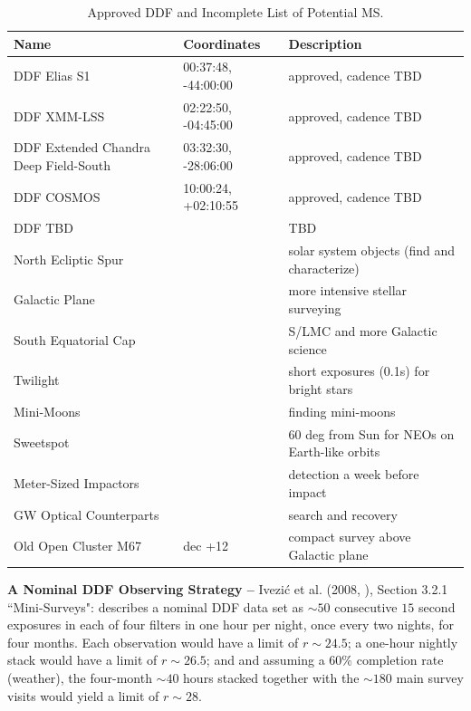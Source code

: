 \documentclass[DM,lsstdraft,toc]{lsstdoc}
\begin{document}
\begin{table}[h]
\begin{center}
\begin{footnotesize}
\caption{Approved DDF and Incomplete List of Potential MS.}
\label{tab:ddfms}
\begin{tabular}{lll}
\hline \hline
Name & Coordinates & Description  \\
\hline
DDF Elias S1    & 00:37:48, -44:00:00  & approved, cadence TBD \\
DDF XMM-LSS & 02:22:50, -04:45:00  & approved, cadence TBD  \\
DDF Extended Chandra Deep Field-South & 03:32:30, -28:06:00  & approved, cadence TBD  \\
DDF COSMOS  & 10:00:24, +02:10:55 & approved, cadence TBD  \\
DDF TBD  & & TBD \\
North Ecliptic Spur      & & solar system objects (find and characterize) \\
Galactic Plane             & & more intensive stellar surveying \\
South Equatorial Cap  & & S/LMC and more Galactic science \\
Twilight                        & & short exposures (0.1s) for bright stars \\
Mini-Moons                     &  & finding mini-moons \\
Sweetspot                       & & 60 deg from Sun for NEOs on Earth-like orbits \\
Meter-Sized Impactors     & & detection a week before impact \\
GW Optical Counterparts & & search and recovery \\
Old Open Cluster M67      & dec +12 & compact survey above Galactic plane  \\
\hline
\end{tabular}
\end{footnotesize}
\end{center}
\end{table}

\textbf{A Nominal DDF Observing Strategy -- } Ivezi\'{c} et al. (2008, \cite{2008arXiv0805.2366I}), Section 3.2.1 ``Mini-Surveys": describes a nominal DDF data set as $\sim50$ consecutive $15$ second exposures in each of four filters in one hour per night, once every two nights, for four months. Each observation would have a limit of $r\sim24.5$; a one-hour nightly stack would have a limit of $r\sim26.5$; and and assuming a $60\%$ completion rate (weather), the four-month $\sim40$ hours stacked together with the $\sim180$ main survey visits would yield a limit of $r\sim28$. 
\end{document}
